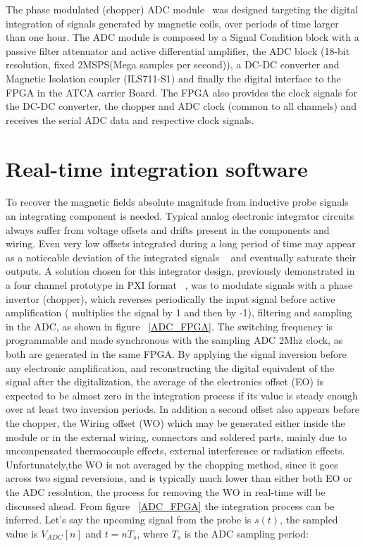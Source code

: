 The phase modulated (chopper) ADC module~\cite{Batista2010} was designed targeting the digital integration of signals generated by magnetic coils, over periods of time larger
than one hour. The ADC module is composed by a  Signal Condition block with a passive filter attenuator and active differential amplifier, the ADC block (18-bit resolution, fixed 2MSPS(Mega samples per second)), a DC-DC converter and Magnetic Isolation coupler (ILS711-S1) and finally the digital interface to the FPGA in the ATCA carrier Board. The FPGA also provides the clock signals for the DC-DC converter, the chopper and ADC clock (common to all channels) and receives the serial ADC data and respective clock signals.




\section{Real-time  integration software}

To recover the magnetic fields absolute magnitude from inductive probe signals an integrating component is needed. Typical analog electronic integrator circuits always suffer from voltage offsets and drifts present in the components and wiring. Even very low offsets integrated during a long period of time may appear as a noticeable deviation of the integrated signals ~\cite{Spuig2003} and eventually saturate their outputs. A solution chosen for this integrator design, previously demonstrated in a four channel prototype in PXI format ~\cite{Werner2008}, was to modulate signals with a phase invertor (chopper), which reverses periodically the input signal before active amplification ( multiplies the signal by 1 and then by -1), filtering and sampling in the ADC, as shown in figure ~\ref{ADC_FPGA}. The switching frequency is programmable and made synchronous with the sampling ADC 2Mhz clock, as both are generated in the same FPGA. By applying the signal inversion before any electronic amplification, and reconstructing the digital equivalent of the signal after the digitalization, the average of the electronics offset (EO) is expected to be almost  zero in the integration process if its value is steady enough over at least two inversion periods. In addition a second offset also appears before the chopper, the Wiring offset (WO) which may be generated either inside the module or in the external wiring, connectors and soldered parts, mainly due to uncompensated thermocouple effects, external interference or radiation effects. Unfortunately,the WO is not averaged by the chopping method, since it goes across two signal reversions, and is typically much lower than either both EO or the ADC resolution, the process for removing the WO in real-time will be discussed ahead. From figure ~\ref{ADC_FPGA} the integration process can be inferred. Let's say the upcoming signal from the probe is $s(t)$, the sampled value is $V_{ADC}[n]$ and $t=nT_s$, where $T_s$ is the ADC sampling period:
\smallskip


